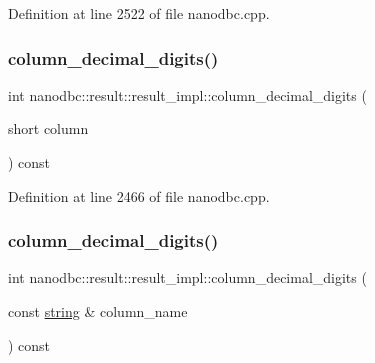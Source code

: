 Definition at line 2522 of file nanodbc.\+cpp.

\mbox{\label{classnanodbc_1_1result_1_1result__impl_a0dfa45f48ad806524bbeb0aa15f370ad}} 
\subsubsection{\texorpdfstring{column\_decimal\_digits()}{column\_decimal\_digits()}\hspace{0.1cm}{\footnotesize\ttfamily [1/2]}}
{\footnotesize\ttfamily int nanodbc\+::result\+::result\+\_\+impl\+::column\+\_\+decimal\+\_\+digits (\begin{DoxyParamCaption}\item[{short}]{column }\end{DoxyParamCaption}) const\hspace{0.3cm}{\ttfamily [inline]}}



Definition at line 2466 of file nanodbc.\+cpp.

\mbox{\label{classnanodbc_1_1result_1_1result__impl_a119ec1353186f0521a6bf11789ac82ca}} 
\subsubsection{\texorpdfstring{column\_decimal\_digits()}{column\_decimal\_digits()}\hspace{0.1cm}{\footnotesize\ttfamily [2/2]}}
{\footnotesize\ttfamily int nanodbc\+::result\+::result\+\_\+impl\+::column\+\_\+decimal\+\_\+digits (\begin{DoxyParamCaption}\item[{const \mbox{\hyperlink{namespacenanodbc_abfc0ece56278e590911ec8352774c212}{string}} \&}]{column\+\_\+name }\end{DoxyParamCaption}) const\hspace{0.3cm}{\ttfamily [inline]}}



